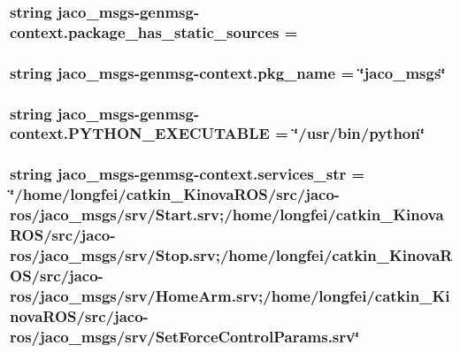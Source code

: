 \subsubsection[{\texorpdfstring{package\+\_\+has\+\_\+static\+\_\+sources}{package_has_static_sources}}]{\setlength{\rightskip}{0pt plus 5cm}string jaco\+\_\+msgs-\/genmsg-\/context.\+package\+\_\+has\+\_\+static\+\_\+sources = \textquotesingle{}\textquotesingle{}}\hypertarget{namespacejaco__msgs-genmsg-context_a1256415124e8f3ceb46c2256ae4626f4}{}\label{namespacejaco__msgs-genmsg-context_a1256415124e8f3ceb46c2256ae4626f4}
\subsubsection[{\texorpdfstring{pkg\+\_\+name}{pkg_name}}]{\setlength{\rightskip}{0pt plus 5cm}string jaco\+\_\+msgs-\/genmsg-\/context.\+pkg\+\_\+name = \char`\"{}jaco\+\_\+msgs\char`\"{}}\hypertarget{namespacejaco__msgs-genmsg-context_a3990cb49bbd31c83da423fce8baf50ea}{}\label{namespacejaco__msgs-genmsg-context_a3990cb49bbd31c83da423fce8baf50ea}
\subsubsection[{\texorpdfstring{P\+Y\+T\+H\+O\+N\+\_\+\+E\+X\+E\+C\+U\+T\+A\+B\+LE}{PYTHON_EXECUTABLE}}]{\setlength{\rightskip}{0pt plus 5cm}string jaco\+\_\+msgs-\/genmsg-\/context.\+P\+Y\+T\+H\+O\+N\+\_\+\+E\+X\+E\+C\+U\+T\+A\+B\+LE = \char`\"{}/usr/bin/python\char`\"{}}\hypertarget{namespacejaco__msgs-genmsg-context_a2658c036e3849ddeebfb3f13d61d6c5d}{}\label{namespacejaco__msgs-genmsg-context_a2658c036e3849ddeebfb3f13d61d6c5d}
\subsubsection[{\texorpdfstring{services\+\_\+str}{services_str}}]{\setlength{\rightskip}{0pt plus 5cm}string jaco\+\_\+msgs-\/genmsg-\/context.\+services\+\_\+str = \char`\"{}/home/longfei/catkin\+\_\+\+Kinova\+R\+OS/src/jaco-\/ros/jaco\+\_\+msgs/srv/Start.\+srv;/home/longfei/catkin\+\_\+\+Kinova\+R\+OS/src/jaco-\/ros/jaco\+\_\+msgs/srv/Stop.\+srv;/home/longfei/catkin\+\_\+\+Kinova\+R\+OS/src/jaco-\/ros/jaco\+\_\+msgs/srv/Home\+Arm.\+srv;/home/longfei/catkin\+\_\+\+Kinova\+R\+OS/src/jaco-\/ros/jaco\+\_\+msgs/srv/Set\+Force\+Control\+Params.\+srv\char`\"{}}\hypertarget{namespacejaco__msgs-genmsg-context_ae9e4dc77a4ea2769807068370b60d144}{}\label{namespacejaco__msgs-genmsg-context_ae9e4dc77a4ea2769807068370b60d144}
